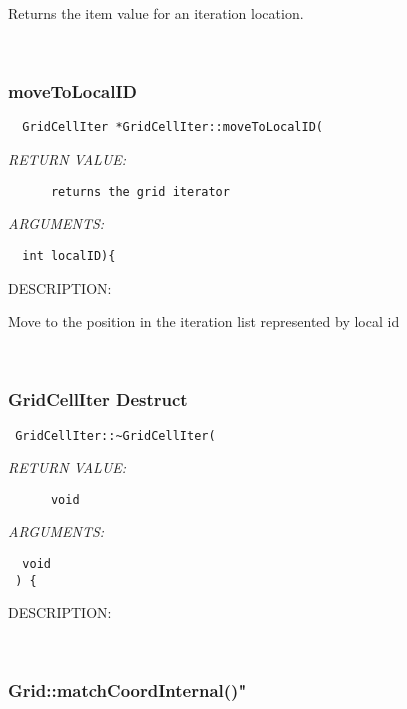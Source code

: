     Returns the item value for an iteration location.
   
 
\mbox{}\hrulefill\
 
\subsubsection [moveToLocalID] {moveToLocalID}


  
\begin{verbatim}  GridCellIter *GridCellIter::moveToLocalID(\end{verbatim}{\em RETURN VALUE:}
\begin{verbatim}      returns the grid iterator\end{verbatim}{\em ARGUMENTS:}
\begin{verbatim}     
  int localID){\end{verbatim}
{\sf DESCRIPTION:\\ }


   Move to the position in the iteration list represented by local id
   
 
\mbox{}\hrulefill\
 
\subsubsection [GridCellIter] {GridCellIter Destruct}


  
\begin{verbatim} GridCellIter::~GridCellIter(\end{verbatim}{\em RETURN VALUE:}
\begin{verbatim}      void\end{verbatim}{\em ARGUMENTS:}
\begin{verbatim}  void  
 ) {\end{verbatim}
{\sf DESCRIPTION:\\ }


 
   
 
\mbox{}\hrulefill\
 
\subsubsection [Grid::matchCoordInternal()"] {Grid::matchCoordInternal()"}


